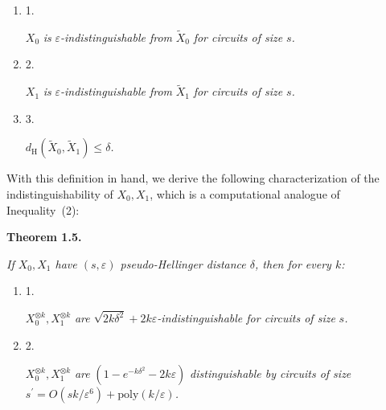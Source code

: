 \documentclass[10pt,a4paper]{article}
\begin{document}
\begin{enumerate}


\item[] 
1. 


$X_{0}$\emph{ is }$\varepsilon$\emph{-indistinguishable from }$\widetilde{X}_{0}$\emph{ for circuits of size }$s$\emph{.}\par





\item[] 
2. 


$X_{1}$\emph{ is }$\varepsilon$\emph{-indistinguishable from }$\widetilde{X}_{1}$\emph{ for circuits of size }$s$\emph{.}\par





\item[] 
3. 


$d_{\mathrm{H}}(\widetilde{X}_{0},\widetilde{X}_{1})\leq\delta$\emph{.}\par





\end{enumerate}






With this definition in hand, we derive the following characterization of the indistinguishability of $X_{0},X_{1}$, which is a computational analogue of Inequality (2):\par





\par\medskip\noindent\textbf{
\textbf{Theorem 1.5}\textbf{.}
}\par



\emph{If $X_{0},X_{1}$ have $(s,\varepsilon)$ pseudo-Hellinger distance $\delta$, then for every $k$:}\par


\begin{enumerate}


\item[] 
1. 


$X_{0}^{\otimes k},X_{1}^{\otimes k}$\emph{ are }$\sqrt{2k\delta^{2}}+2k\varepsilon$\emph{-indistinguishable for circuits of size }$s$\emph{.}\par





\item[] 
2. 


$X_{0}^{\otimes k},X_{1}^{\otimes k}$\emph{ are }$(1-e^{-k\delta^{2}}-2k\varepsilon)$\emph{ distinguishable by circuits of size }$s^{\prime}=O(sk/\varepsilon^{6})+\mathrm{poly}(k/\varepsilon)$\emph{.}\par





\end{enumerate}
\end{document}

